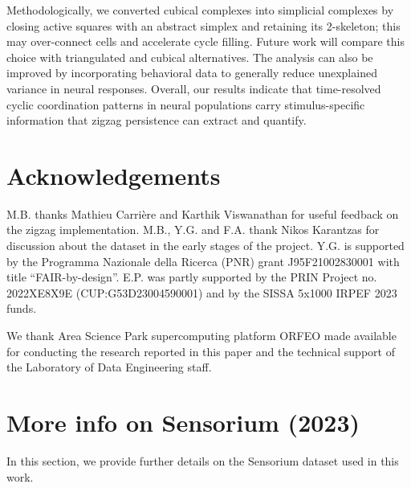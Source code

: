 \documentclass[11pt]{article}
\begin{document}
Methodologically, we converted cubical complexes into simplicial complexes by closing active squares with an abstract simplex and retaining its 2-skeleton; this may over-connect cells and accelerate cycle filling. Future work will compare this choice with triangulated and cubical alternatives. The analysis can also be improved by incorporating behavioral data to generally reduce unexplained variance in neural responses. Overall, our results indicate that time-resolved cyclic coordination patterns in neural populations carry stimulus-specific information that zigzag persistence can extract and quantify.
\section*{Acknowledgements}

M.B. thanks Mathieu Carrière and Karthik Viswanathan for useful feedback on the zigzag implementation. M.B., Y.G. and F.A. thank Nikos Karantzas for discussion about the dataset in the early stages of the project. Y.G. is supported by the
Programma Nazionale della Ricerca (PNR) grant J95F21002830001 with title “FAIR-by-design”. E.P. was partly supported by the PRIN Project no. 2022XE8X9E (CUP:G53D23004590001) and by the SISSA 5x1000 IRPEF 2023 funds.

We thank Area Science Park supercomputing platform ORFEO made
available for conducting the research reported in this paper and the technical support of the Laboratory of Data Engineering staff.




\appendix

\section{More info on Sensorium (2023)}\label{app:dataset}

In this section, we provide further details on the Sensorium dataset \cite{sensorium2023} used in this work.
\end{document}
